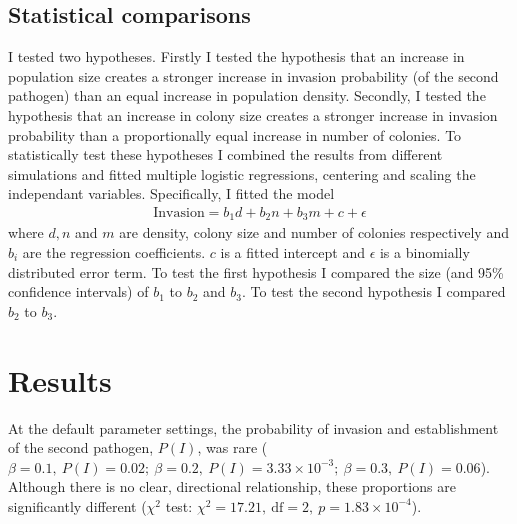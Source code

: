 \subsection{Statistical comparisons}

I tested two hypotheses.
Firstly I tested the hypothesis that an increase in population size creates a stronger increase in invasion probability (of the second pathogen) than an equal increase in population density.
Secondly, I tested the hypothesis that an increase in colony size creates a stronger increase in invasion probability than a proportionally equal increase in number of colonies.
To statistically test these hypotheses I combined the results from different simulations and fitted multiple logistic regressions, centering and scaling the independant variables.
Specifically, I fitted the model 
\begin{align}
  \text{Invasion} = b_1 d + b_2 n + b_3 m + c + \epsilon
\end{align}
where $d, n$ and $m$ are density, colony size and number of colonies respectively and $b_i$ are the regression coefficients. 
$c$ is a fitted intercept and $\epsilon$ is a binomially distributed error term.
To test the first hypothesis I compared the size (and 95\% confidence intervals) of $b_1$ to $b_2$ and $b_3$.
To test the second hypothesis I compared $b_2$ to $b_3$.








\section{Results}





At the default parameter settings, the probability of invasion and establishment of the second pathogen, $P(I)$,  was rare ($\beta = 0.1,\: P(I) = 0.02;\: \beta = 0.2,\: P(I) = \ensuremath{3.33\times 10^{-3}};\: \beta = 0.3,\: P(I) = 0.06$).
Although there is no clear, directional relationship, these proportions are significantly different ($\chi^2$ test: $\chi^2 = 17.21,\: \text{df} = 2,\: p = \ensuremath{1.83\times 10^{-4}}$).

